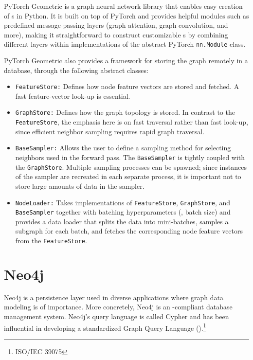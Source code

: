 PyTorch Geometric is a graph neural network library that enables easy creation of
s in Python. It is built on top of PyTorch and provides helpful modules
such as predefined message-passing layers (graph attention, graph convolution, and
more), making it straightforward to construct customizable s by combining
different layers within implementations of the abstract PyTorch \texttt{nn.Module}
class.

PyTorch Geometric also provides a framework for storing the graph remotely in a
database, through the following abstract classes:

\begin{itemize}
    \item \texttt{FeatureStore:} Defines how node feature vectors are stored and
    fetched. A fast feature-vector look-up is essential.

    \item \texttt{GraphStore:} Defines how the graph topology is stored. In contrast
    to the \texttt{FeatureStore}, the emphasis here is on fast traversal rather than
    fast look-up, since efficient neighbor sampling requires rapid graph traversal.

    \item \texttt{BaseSampler:} Allows the user to define a sampling method for
    selecting neighbors used in the forward pass. The \texttt{BaseSampler} is tightly
    coupled with the \texttt{GraphStore}. Multiple sampling processes can be spawned;
    since instances of the sampler are recreated in each separate process, it is
    important not to store large amounts of data in the sampler.

    \item \texttt{NodeLoader:} Takes implementations of \texttt{FeatureStore},
    \texttt{GraphStore}, and \texttt{BaseSampler} together with batching
    hyperparameters (\eg, batch size) and provides a data loader that splits the data
    into mini-batches, samples a subgraph for each batch, and fetches the
    corresponding node feature vectors from the \texttt{FeatureStore}.
\end{itemize}


\section{Neo4j}\label{sec:neo4j}

Neo4j is a persistence layer used in diverse applications where graph data modeling is
of importance. More concretely, Neo4j is an -compliant database
management system. Neo4j's query language is called Cypher and has been influential in
developing a standardized Graph Query Language ().\footnote{ISO/IEC 39075}

